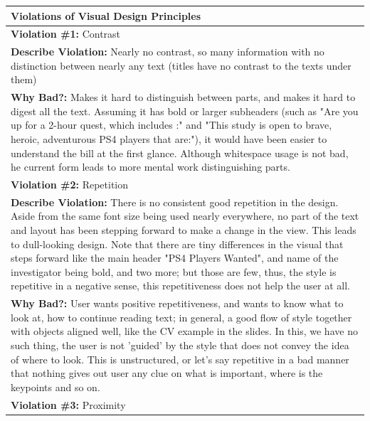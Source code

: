 \documentclass[a4paper,11pt,oneside]{scrreprt}
\begin{document}
\begin{tabularx}{\textwidth}{|X|}
	\hline
		\textbf{Violations of Visual Design Principles}
		\\
	\hline
		\textbf{Violation \#1:} Contrast
		
		\\
		\textbf{Describe Violation:} Nearly no contrast, so many information with no distinction between nearly any text (titles have no contrast to the texts under them)
		
		
		\\
		\textbf{Why Bad?:} Makes it hard to distinguish between parts, and makes it hard to digest all the text. Assuming it has bold or larger subheaders (such as "Are you up for a 2-hour quest, which includes :" and "This study is open to brave, heroic, adventurous PS4 players that are:"), it would have been easier to understand the bill at the first glance. Although whitespace usage is not bad, he current form leads to more mental work distinguishing parts.
		
	\\
	\hline
	
		\textbf{Violation \#2:} Repetition
		
		\\
		\textbf{Describe Violation:} There is no consistent good repetition in the design. Aside from the same font size being used nearly everywhere, no part of the text and layout has been stepping forward to make a change in the view. This leads to dull-looking design. Note that there are tiny differences in the visual that steps forward like the main header "PS4 Players Wanted", and name of the investigator being bold, and two more; but those are few, thus, the style is repetitive in a negative sense, this repetitiveness does not help the user at all. 
		
		\\
		\textbf{Why Bad?:} User wants positive repetitiveness, and wants to know what to look at, how to continue reading text; in general, a good flow of style together with objects aligned well, like the CV example in the slides. In this, we have no such thing, the user is not 'guided' by the style that does not convey the idea of where to look. This is unstructured, or let's say repetitive in a bad manner that nothing gives out user any clue on what is important, where is the keypoints and so on.
		
	\\
	\hline	
	
		\textbf{Violation \#3:} Proximity
		

\end{tabularx}
\end{document}
